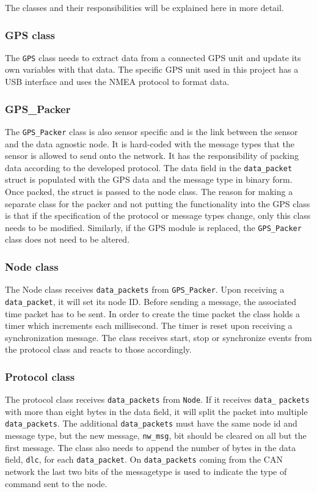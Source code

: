 The classes and their responsibilities will be explained here in more detail.

\subsubsection*{GPS class}
The \texttt{GPS} class needs to extract data from a connected GPS unit and update its own variables with that data.
The specific GPS unit used in this project has a USB interface and uses the NMEA protocol to format data.

\subsubsection*{GPS\_Packer}
The \texttt{GPS\_Packer} class is also sensor specific and is the link between the sensor and the data agnostic node.
It is hard-coded with the message types that the sensor is allowed to send onto the network.
It has the responsibility of packing data according to the developed protocol.
The data field in the \texttt{data\_packet} struct is populated with the GPS data and the message type in binary form.
Once packed, the struct is passed to the node class.
The reason for making a separate class for the packer and not putting the functionality into the GPS class is that if the specification of the protocol or message types change, only this class needs to be modified.
Similarly, if the GPS module is replaced, the \texttt{GPS\_Packer} class does not need to be altered.

\subsubsection*{Node class}
The Node class receives \texttt{data\_packets} from \texttt{GPS\_Packer}.
Upon receiving a \texttt{data\_packet}, it will set its node ID.
Before sending a message, the associated time packet has to be sent.
In order to create the time packet the class holds a timer which increments each millisecond.
The timer is reset upon receiving a synchronization message.
The class receives start, stop or synchronize events from the protocol class and reacts to those accordingly.

\subsubsection*{Protocol class}

The protocol class receives \texttt{data\_packets} from \texttt{Node}. 
If it receives \texttt{data\_} \texttt{packets} with more than eight bytes in the data field, it will split the packet into multiple \texttt{data\_packets}.
The additional \texttt{data\_packets} must have the same node id and message type, but the new message, \texttt{nw\_msg}, bit should be cleared on all but the first message.
The class also needs to append the number of bytes in the data field, \texttt{dlc}, for each \texttt{data\_packet}.
On \texttt{data\_packets} coming from the CAN network the last two bits of the messagetype is used to indicate the type of command sent to the node.

